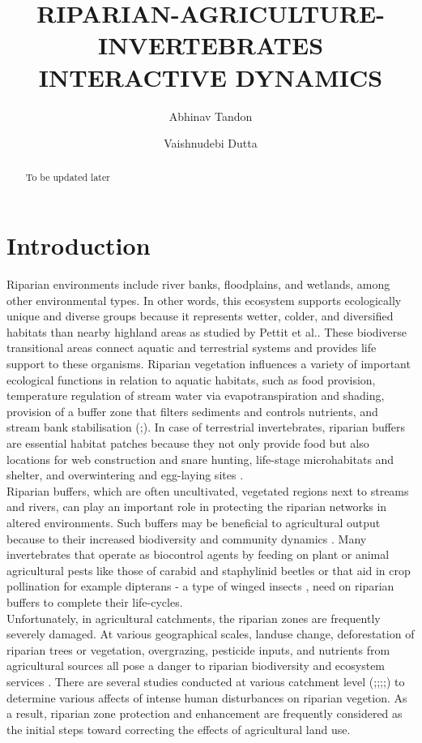 \documentclass[12pt]{article}
\date{}
\author[1]{Abhinav Tandon}
\author[2]{Vaishnudebi Dutta}
\affil[1]{Corresponding Author\thanks{abhinav.abhi02@gmail.com}}
\affil[1,2]{Birla Institute of Technology Mesra, Ranchi - 835215, Jharkhand, INDIA}
\title{RIPARIAN-AGRICULTURE-INVERTEBRATES INTERACTIVE DYNAMICS}
\date{}
\numberwithin{equation}{section}
\begin{document}
\maketitle
\vspace{-1cm}
\begin{abstract}
To be updated later
\end{abstract}
\section{Introduction}
Riparian environments include river banks, floodplains, and wetlands, among other environmental types. In other words, this ecosystem supports ecologically unique and diverse groups because it represents wetter, colder, and diversified habitats than nearby highland areas as studied by Pettit et al.\cite{pettit2007fire}. These biodiverse transitional areas connect aquatic and terrestrial systems \cite{popescu2021riparian} and provides life support to these organisms. Riparian vegetation influences a variety of important ecological functions in relation to aquatic habitats, such as food provision, temperature regulation of stream water via evapotranspiration and shading, provision of a buffer zone that filters sediments and controls nutrients, and stream bank stabilisation (\cite{hood2000};\cite{richardson2007}). In case of terrestrial invertebrates, riparian buffers are essential habitat patches because they not only provide food but also locations for web construction and snare hunting, life-stage microhabitats and shelter, and overwintering and egg-laying sites \cite{popescu2021riparian}.\\ 
Riparian buffers, which are often uncultivated, vegetated regions next to streams and rivers, can play an important role in protecting the riparian networks in altered environments\cite{burdon2020assessing}. Such buffers may be beneficial to agricultural output because to their increased biodiversity and community dynamics \cite{forio2020small}. Many invertebrates that operate as biocontrol agents by feeding on plant or animal agricultural pests like those of carabid and staphylinid beetles \cite{andersen2000long} or that aid in crop pollination for example dipterans - a type of winged insects \cite{ssymank2008pollinating}, need on riparian buffers to complete their life-cycles.\\
Unfortunately, in agricultural catchments, the riparian zones are frequently severely damaged. At various geographical scales, landuse change, deforestation of riparian trees or vegetation, overgrazing, pesticide inputs, and nutrients from agricultural sources all pose a danger to riparian biodiversity and ecosystem services \cite{burdon2013habitat}. There are several studies conducted at various catchment level (\cite{cesarini2022riparian};\cite{alemu2018identifying};\cite{heartsill2003riparian};\cite{corbacho2003patterns};\cite{schlosser1981riparian}) to determine various affects of intense human disturbances on riparian vegetion. As a result, riparian zone protection and enhancement are frequently considered as the initial steps toward correcting the effects of agricultural land use.\\
\end{document}
